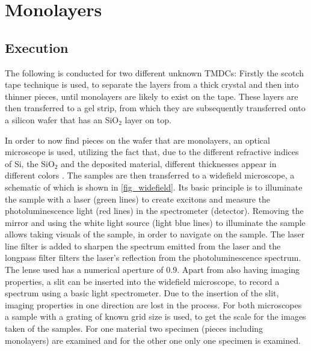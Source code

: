 \section{Monolayers}
\label{sec:mono}

\subsection{Execution}

The following is conducted for two different unknown TMDCs:
Firstly the scotch tape technique is used, to separate the layers from a thick crystal and then into thinner pieces, until monolayers are likely to exist on the tape.
These layers are then transferred to a gel strip, from which they are subsequently transferred onto a silicon wafer that has an SiO$_2$ layer on top.

In order to now find pieces on the wafer that are monolayers, an optical microscope is used, utilizing the fact that, due to the different refractive indices of Si, the SiO$_2$ and the deposited material, different thicknesses appear in different colors \cite{benameur2011}.
The samples are then transferred to a widefield microscope, a schematic of which is shown in \cref{fig_widefield}.
Its basic principle is to illuminate the sample with a laser (green lines) to create excitons and measure the photoluminescence light (red lines) in the spectrometer (detector).
Removing the mirror and using the white light source (light blue lines) to illuminate the sample allows taking visuals of the sample, in order to navigate on the sample.
The laser line filter is added to sharpen the spectrum emitted from the laser and the longpass filter filters the laser's reflection from the photoluminescence spectrum.
The lense used has a numerical aperture of \SI{0.9}{}.
Apart from also having imaging properties, a slit can be inserted into the widefield microscope, to record a spectrum using a basic light spectrometer.
Due to the insertion of the slit, imaging properties in one direction are lost in the process.
For both microscopes a sample with a grating of known grid size is used, to get the scale for the images taken of the samples.
For one material two specimen (pieces including monolayers) are examined and for the other one only one specimen is examined.

